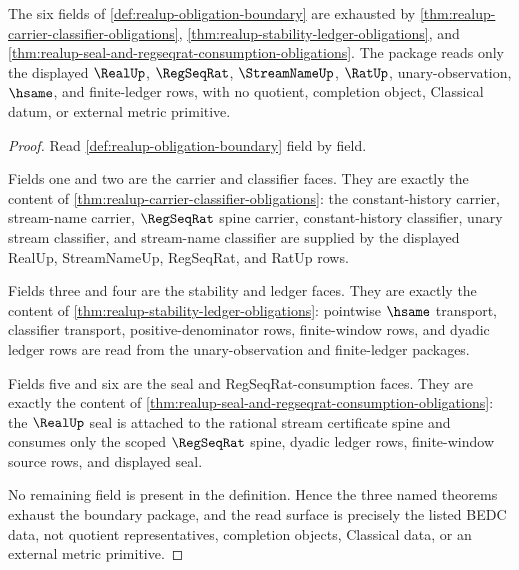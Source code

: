 \begin{theorem}
\label{thm:realup-obligation-boundary-package}
The six fields of \autoref{def:realup-obligation-boundary} are exhausted by
\autoref{thm:realup-carrier-classifier-obligations},
\autoref{thm:realup-stability-ledger-obligations}, and
\autoref{thm:realup-seal-and-regseqrat-consumption-obligations}. The package
reads only the displayed $\RealUp$, $\RegSeqRat$, $\StreamNameUp$, $\RatUp$,
unary-observation, $\hsame$, and finite-ledger rows, with no quotient,
completion object, Classical datum, or external metric primitive.
\end{theorem}
\begin{proof}
Read \autoref{def:realup-obligation-boundary} field by field.

Fields one and two are the carrier and classifier faces. They are exactly the
content of \autoref{thm:realup-carrier-classifier-obligations}: the
constant-history carrier, stream-name carrier, $\RegSeqRat$ spine carrier,
constant-history classifier, unary stream classifier, and stream-name
classifier are supplied by the displayed RealUp, StreamNameUp, RegSeqRat, and
RatUp rows.

Fields three and four are the stability and ledger faces. They are exactly the
content of \autoref{thm:realup-stability-ledger-obligations}: pointwise
$\hsame$ transport, classifier transport, positive-denominator rows,
finite-window rows, and dyadic ledger rows are read from the unary-observation
and finite-ledger packages.

Fields five and six are the seal and RegSeqRat-consumption faces. They are
exactly the content of
\autoref{thm:realup-seal-and-regseqrat-consumption-obligations}: the
$\RealUp$ seal is attached to the rational stream certificate spine and
consumes only the scoped $\RegSeqRat$ spine, dyadic ledger rows,
finite-window source rows, and displayed seal.

No remaining field is present in the definition. Hence the three named
theorems exhaust the boundary package, and the read surface is precisely the
listed BEDC data, not quotient representatives, completion objects,
Classical data, or an external metric primitive.
\end{proof}
